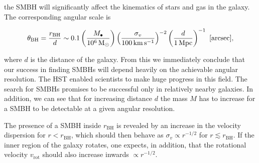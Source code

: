 \documentclass[a4paper,11pt]{article}
\begin{document}
{\noindent}the SMBH will significantly affect the kinematics of stars and gas in the galaxy. The corresponding angular scale is

\begin{align*}
    \theta_\mathrm{BH} = \frac{r_\mathrm{BH}}{d} \sim 0.1\left(\frac{M_\bullet}{10^6\,{\rm M_\odot}}\right) \left(\frac{\sigma_v}{100\,{\rm km\,s^{-1}}}\right)^{-2} \left(\frac{d}{1\,{\rm Mpc}}\right)^{-1} ~ [{\rm arcsec}],
\end{align*}

{\noindent}where $d$ is the distance of the galaxy. From this we immediately conclude that our success in finding SMBHs will depend heavily on the achievable angular resolution. The HST enabled scientists to make huge progress in this field. The search for SMBHs promises to be successful only in relatively nearby galaxies. In addition, we can see that for increasing distance $d$ the mass $M$  has to increase for a SMBH to be detectable at a given angular resolution.

{\noindent}The presence of a SMBH inside $r_\mathrm{BH}$ is revealed by an increase in the velocity dispersion for $r<r_\mathrm{BH}$, which should then behave as  $\sigma_v\propto r^{-1/2}$ for $r\lesssim r_\mathrm{BH}$. If the inner region of the galaxy rotates, one expects, in addition, that the rotational velocity $v_\mathrm{rot}$ should also increase inwards $\propto r^{-1/2}$.
\end{document}
